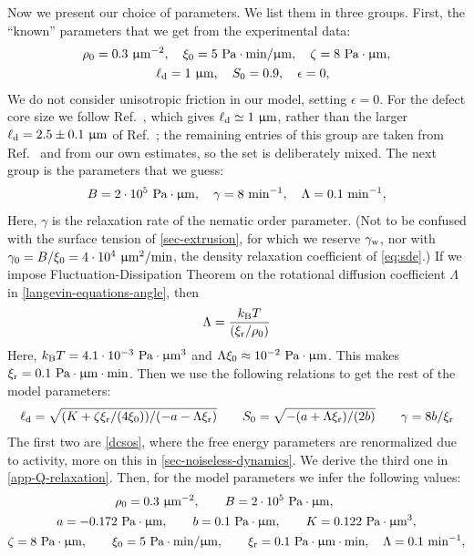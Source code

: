 \documentclass[a5paper]{article}
\begin{document}
Now we present our choice of parameters. We list them in three groups.
First, the ``known'' parameters that we get from the experimental data:
\begin{gather}
    \rho_0 = 0.3 ~\upmu\mathrm{m}^{-2},
    \quad
    \xi_0 = 5 ~\text{Pa} \cdot \text{min} / \upmu\mathrm{m},
    \quad
    \zeta = 8 ~\text{Pa} \cdot \upmu\mathrm{m},
    \\
    \quad
    \ell_{\rm d} = 1 ~\upmu\mathrm{m},
    \quad
    S_0 = 0.9,
    \quad
    \epsilon = 0,
\end{gather}
We do not consider unisotropic friction in our model, setting $\epsilon = 0$.
For the defect core size we follow Ref.~\cite{han2025local}, which gives $\ell_{\rm d} \simeq 1~\upmu\mathrm{m}$, rather than the larger $\ell_{\rm d} = 2.5 \pm 0.1~\upmu\mathrm{m}$ of Ref.~\cite{copenhagen}; the remaining entries of this group are taken from Ref.~\cite{copenhagen} and from our own estimates, so the set is deliberately mixed.
The next group is the parameters that we guess:
\begin{gather}
    B = 2\cdot10^{5} ~\text{Pa} \cdot \upmu\mathrm{m},
    \quad
    \gamma = 8 ~\text{min}^{-1},
    \quad
    \Lambda = 0.1 ~\text{min}^{-1},
\end{gather}
Here, $\gamma$ is the relaxation rate of the nematic order parameter. (Not to be confused with the surface tension of \cref{sec-extrusion}, for which we reserve $\gamma_{\rm w}$, nor with $\gamma_0 = B/\xi_0 = 4\cdot10^{4}~\upmu\mathrm{m}^2/\text{min}$, the density relaxation coefficient of \eqref{eq:sde}.)
If we impose Fluctuation-Dissipation Theorem on the rotational diffusion coefficient $\Lambda$ in \cref{langevin-equations-angle}, then
\begin{align}
    \Lambda = \frac{k_\mathrm{B} T}{(\xi_{\rm r}/\rho_0)}
\end{align}
Here, $k_\mathrm{B} T = 4.1 \cdot 10^{-3} ~\text{Pa} \cdot \upmu\mathrm{m}^3$ and $\Lambda \xi_0 \approx 10^{-2} ~\text{Pa} \cdot \upmu\mathrm{m}$. This makes $\xi_{\rm r}=0.1 ~\text{Pa} \cdot \upmu\mathrm{m} \cdot \text{min}$.
Then we use the following relations to get the rest of the model parameters:
\begin{align}
    \ell_{\rm d} = \sqrt{(K+\zeta\xi_{\rm r}/(4\xi_0))/(-a-\Lambda \xi_{\rm r})} \qquad S_0 = \sqrt{-(a+\Lambda \xi_{\rm r})/(2b)}
    \qquad 
     \gamma = {8 b}/{\xi_{\rm r}}
\end{align}
The first two are \eqref{dcsos}, where the free energy parameters are renormalized due to activity, more on this in \cref{sec-noiseless-dynamics}. 
We derive the third one in \cref{app-Q-relaxation}.
Then, for the model parameters we infer the following values:
\begin{gather}
    \rho_0 = 0.3 ~\upmu\mathrm{m}^{-2},
    \qquad
    B = 2\cdot10^{5} ~\text{Pa} \cdot \upmu\mathrm{m},
    \qquad
    \\
    a = -0.172 ~\text{Pa} \cdot \upmu\mathrm{m},
    \qquad
    b = 0.1 ~\text{Pa} \cdot \upmu\mathrm{m},
    \qquad
    K = 0.122 ~\text{Pa} \cdot \upmu\mathrm{m}^3,
    \\
    \zeta = 8 ~\text{Pa} \cdot \upmu\mathrm{m},
    \qquad
    \xi_0 = 5 ~\text{Pa} \cdot \text{min} / \upmu\mathrm{m},
    \qquad
    \xi_{\rm r} = 0.1 ~\text{Pa} \cdot \upmu\mathrm{m} \cdot \text{min},
    \quad
    \Lambda = 0.1 ~\text{min}^{-1},
\end{gather}
\end{document}
